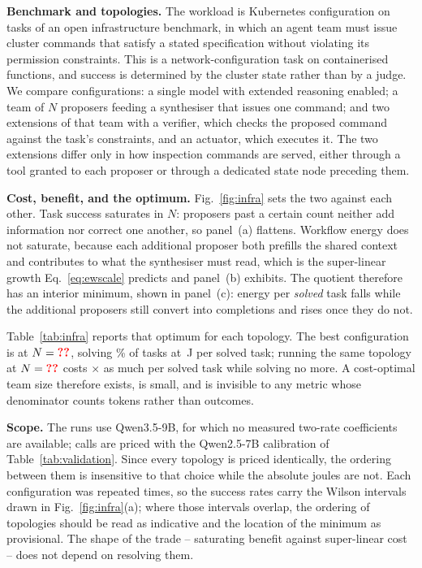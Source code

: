 \documentclass[journal]{IEEEtran}
\newif\ifshowchanges \showchangestrue
\newcommand{\OLD}{\ifshowchanges\color{black}\fi}
\newcommand{\ROOF}{\ifshowchanges\color{green!45!black}\fi}
\begin{document}
\ROOF{}\textbf{Benchmark and topologies.} The workload is Kubernetes configuration on
\infraTasks{} tasks of an open infrastructure benchmark, in which an agent team must issue cluster
commands that satisfy a stated specification without violating its permission constraints. This is
a network-configuration task on containerised functions, and success is determined by the cluster
state rather than by a judge. We compare \infraTopos{} configurations: a single model with
extended reasoning enabled; a team of $N$ proposers feeding a synthesiser that issues one command;
and two extensions of that team with a verifier, which checks the proposed command against the
task's constraints, and an actuator, which executes it. The two extensions differ only in how
inspection commands are served, either through a tool granted to each proposer or through a
dedicated state node preceding them.

\ROOF{}\textbf{Cost, benefit, and the optimum.} Fig.~\ref{fig:infra} sets the two against each
other. Task success saturates in $N$: proposers past a certain count neither add information nor
correct one another, so panel~(a) flattens. Workflow energy does not saturate, because each
additional proposer both prefills the shared context and contributes to what the synthesiser must
read, which is the super-linear growth Eq.~\eqref{eq:ewscale} predicts and panel~(b) exhibits. The
quotient therefore has an interior minimum, shown in panel~(c): energy per \emph{solved} task
falls while the additional proposers still convert into completions and rises once they do not.

\ROOF{}Table~\ref{tab:infra} reports that optimum for each topology. The best configuration is
\infraBestTopo{} at $N=\textcolor{red}{\textbf{??}}{}$, solving \infraBestRate{}\% of tasks at
\infraBestJ{}\,J per solved task; running the same topology at $N=\textcolor{red}{\textbf{??}}{}$ costs
\infraOverrun{}$\times$ as much per solved task while solving no more. A cost-optimal team size
therefore exists, is small, and is invisible to any metric whose denominator counts tokens rather
than outcomes.

\ROOF{}\textbf{Scope.} The runs use Qwen3.5-9B, for which no measured two-rate coefficients are
available; calls are priced with the Qwen2.5-7B calibration of Table~\ref{tab:validation}. Since
every topology is priced identically, the ordering between them is insensitive to that choice
while the absolute joules are not. Each configuration was repeated \infraRuns{} times, so the
success rates carry the Wilson intervals drawn in Fig.~\ref{fig:infra}(a); where those intervals
overlap, the ordering of topologies should be read as indicative and the location of the minimum
as provisional. The shape of the trade -- saturating benefit against super-linear cost -- does not
depend on resolving them.
\endgroup\OLD{}
\end{document}
